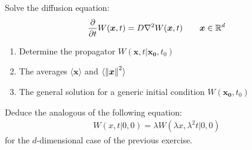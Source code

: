 \documentclass[../template.tex]{subfiles}
\begin{document}
\begin{exo}
    Solve the diffusion equation:
    \begin{align*}
        \pdv{t} W(\bm{x},t) = D \nabla^2 W(\bm{x},t) \qquad \bm{x} \in \mathbb{R}^d
    \end{align*}
    \begin{enumerate}
        \item Determine the propagator $W(\bm{x},t|\bm{x_0},t_0)$
        \item The averages $\langle \bm{x} \rangle$ and $\langle \norm{\bm{x}}^2 \rangle$
        \item The general solution for a generic initial condition $W(\bm{x_0},t_0)$
    \end{enumerate}
    
\end{exo}

\begin{exo}
    Deduce the analogous of the following equation:
    \begin{align*}
        W(x,t|0,0) = \lambda W(\lambda x, \lambda^2 t|0,0)
    \end{align*}
    for the $d$-dimensional case of the previous exercise.
\end{exo}
\end{document}
